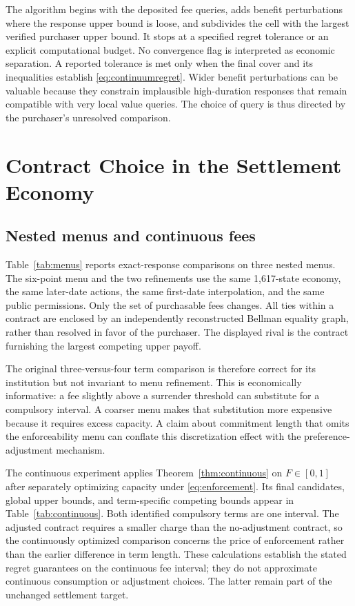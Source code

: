 The algorithm begins with the deposited fee queries, adds benefit perturbations where the response upper bound is loose, and subdivides the cell with the largest verified purchaser upper bound. It stops at a specified regret tolerance or an explicit computational budget. No convergence flag is interpreted as economic separation. A reported tolerance is met only when the final cover and its inequalities establish \eqref{eq:continuumregret}. Wider benefit perturbations can be valuable because they constrain implausible high-duration responses that remain compatible with very local value queries. The choice of query is thus directed by the purchaser's unresolved comparison.

\section{Contract Choice in the Settlement Economy}
\label{sec:results}
\subsection{Nested menus and continuous fees}
Table~\ref{tab:menus} reports exact-response comparisons on three nested menus. The six-point menu and the two refinements use the same 1,617-state economy, the same later-date actions, the same first-date interpolation, and the same public permissions. Only the set of purchasable fees changes. All ties within a contract are enclosed by an independently reconstructed Bellman equality graph, rather than resolved in favor of the purchaser. The displayed rival is the contract furnishing the largest competing upper payoff.


The original three-versus-four term comparison is therefore correct for its institution but not invariant to menu refinement. This is economically informative: a fee slightly above a surrender threshold can substitute for a compulsory interval. A coarser menu makes that substitution more expensive because it requires excess capacity. A claim about commitment length that omits the enforceability menu can conflate this discretization effect with the preference-adjustment mechanism.

The continuous experiment applies Theorem~\ref{thm:continuous} on $F\in[0,1]$ after separately optimizing capacity under \eqref{eq:enforcement}. Its final candidates, global upper bounds, and term-specific competing bounds appear in Table~\ref{tab:continuous}. Both identified compulsory terms are one interval. The adjusted contract requires a smaller charge than the no-adjustment contract, so the continuously optimized comparison concerns the price of enforcement rather than the earlier difference in term length. These calculations establish the stated regret guarantees on the continuous fee interval; they do not approximate continuous consumption or adjustment choices. The latter remain part of the unchanged settlement target.


